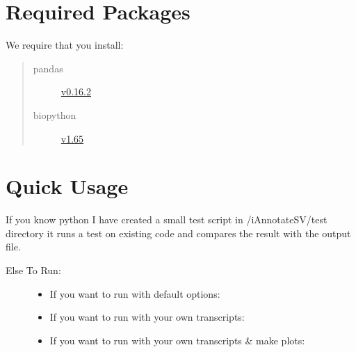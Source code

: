 \documentclass[letterpaper,10pt,english]{sphinxmanual}
\begin{document}
\section{Required Packages}
\label{iAnnotateSV:required-packages}
We require that you install:
\begin{quote}\begin{description}
\item[{pandas}] \leavevmode
\href{http://pandas.pydata.org/}{v0.16.2}

\item[{biopython}] \leavevmode
\href{http://biopython.org/wiki/Main\_Page}{v1.65}

\end{description}\end{quote}


\section{Quick Usage}
\label{iAnnotateSV:quick-usage}
If you know python I have created a small test script in /iAnnotateSV/test directory it runs a test on existing code and compares the result with the output file.
\begin{description}
\item[{Else To Run:}] \leavevmode\begin{itemize}
\item {} 
If you want to run with default options:

\end{itemize}

\begin{itemize}
\item {} 
If you want to run with your own transcripts:

\end{itemize}

\begin{itemize}
\item {} 
If you want to run with your own transcripts \& make plots:

\end{itemize}


\end{description}
\end{document}
